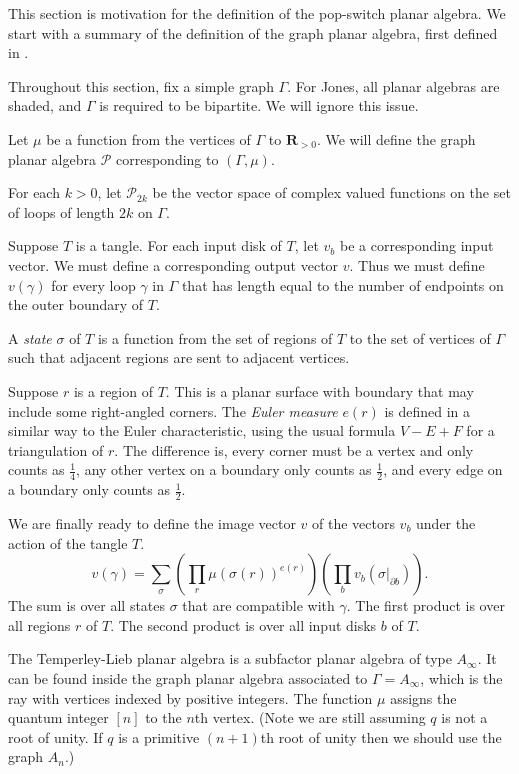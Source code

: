 
This section is motivation
for the definition of the pop-switch planar algebra.
We start with a summary of the definition of the graph planar algebra,
first defined in \cite{JonesGPA}.

Throughout this section,
fix a simple graph $\Gamma$.
For Jones, all planar algebras are shaded,
and $\Gamma$ is required to be bipartite.
We will ignore this issue.

Let $\mu$ be a function from the vertices of $\Gamma$ to $\mathbf{R}_{>0}$.
We will define the graph planar algebra $\mathcal{P}$
corresponding to $(\Gamma, \mu)$.

For each $k > 0$,
let $\mathcal{P}_{2k}$ be the vector space of complex valued functions
on the set of loops of length $2k$ on $\Gamma$.

Suppose $T$ is a tangle.
For each input disk of $T$,
let $v_b$ be a corresponding input vector.
We must define a corresponding output vector $v$.
Thus we must define
$v(\gamma)$ for every loop $\gamma$ in $\Gamma$
that has length equal to the number of endpoints on the outer boundary of $T$.

A {\em state} $\sigma$ of $T$ is a function
from the set of regions of $T$ to the set of vertices of $\Gamma$
such that adjacent regions are sent to adjacent vertices.

Suppose $r$ is a region of $T$.
This is a planar surface with boundary
that may include some right-angled corners.
The {\em Euler measure} $e(r)$
is defined in a similar way to the Euler characteristic,
using the usual formula $V - E + F$ for a triangulation of $r$.
The difference is,
every corner must be a vertex and only counts as $\frac{1}{4}$,
any other vertex on a boundary only counts as $\frac{1}{2}$,
and every edge on a boundary only counts as $\frac{1}{2}$.

We are finally ready to define the image vector $v$
of the vectors $v_b$
under the action of the tangle $T$.
$$
v(\gamma) =
\sum_\sigma
\left( \prod_r \mu(\sigma(r))^{e(r)} \right)
\left( \prod_b v_b(\sigma|_{\partial b}) \right).
$$
The sum is over all states $\sigma$ that are compatible with $\gamma$.
The first product is over all regions $r$ of $T$.
The second product is over all input disks $b$ of $T$.

The Temperley-Lieb planar algebra
is a subfactor planar algebra of type $A_\infty$.
It can be found inside
the graph planar algebra associated to $\Gamma = A_\infty$,
which is the ray with vertices indexed by positive integers.
The function $\mu$
assigns the quantum integer $[n]$ to the $n$th vertex.
(Note we are still assuming $q$ is not a root of unity.
If $q$ is a primitive $(n+1)$th root of unity
then we should use the graph $A_n$.)

